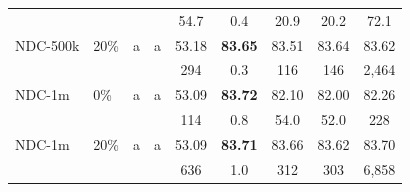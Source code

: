 \begin{table}[!t]
{\begin{tabular}{llccccccc}
 & &  &  & 54.7 & 0.4 & 20.9 & 20.2 & 72.1 \\[2pt]
NDC-500k & 20\% & a & a & 53.18 & \textbf{83.65} & 83.51 & 83.64 & 83.62 \\
 & &  &  & 294 & 0.3 & 116 & 146 & 2,464 \\[2pt]
NDC-1m & 0\% & a & a & 53.09 & \textbf{83.72} & 82.10 & 82.00 & 82.26 \\
 & &  &  & 114 & 0.8 & 54.0 & 52.0 & 228 \\[2pt]
NDC-1m & 20\% & a & a & 53.09 & \textbf{83.71} & 83.66 & 83.62 & 83.70 \\
 & &  &  & 636 & 1.0 & 312 & 303 & 6,858 \\[2pt]
\bottomrule
\end{tabular}}
\end{table}
